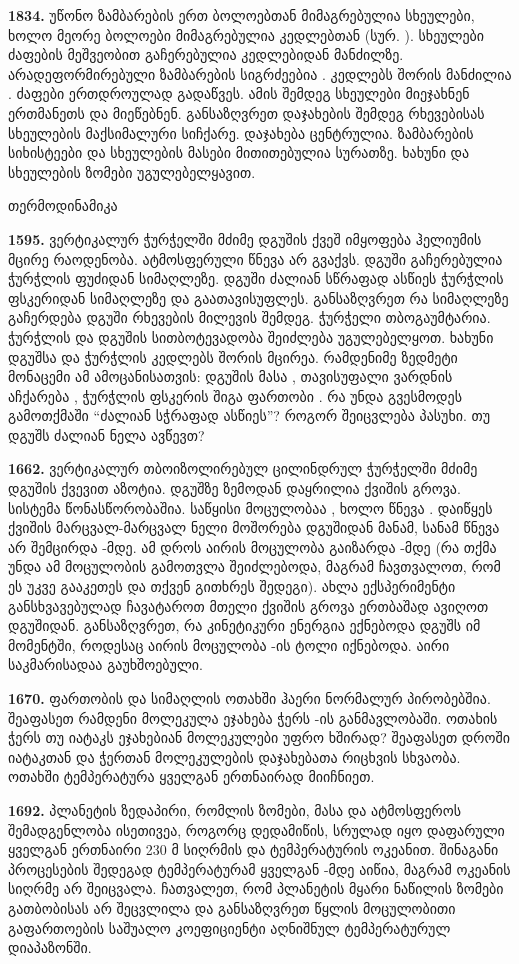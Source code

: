 \documentclass[12pt,a4paper,]{report}
\begin{document}
\textbf{1834.} უწონო ზამბარების ერთ ბოლოებთან  მიმაგრებულია სხეულები, ხოლო მეორე ბოლოები მიმაგრებულია კედლებთან (სურ. ). სხეულები ძაფების მეშვეობით გაჩერებულია კედლებიდან   მანძილზე. არადეფორმირებული ზამბარების სიგრძეებია  . კედლებს შორის მანძილია  . ძაფები ერთდროულად გადაწვეს. ამის შემდეგ სხეულები მიეჯახნენ ერთმანეთს და მიეწებნენ. განსაზღვრეთ დაჯახების შემდეგ რხევებისას სხეულების მაქსიმალური სიჩქარე. დაჯახება ცენტრულია. ზამბარების სიხისტეები და სხეულების მასები მითითებულია სურათზე. ხახუნი და სხეულების ზომები უგულებელყავით.


თერმოდინამიკა

\textbf{1595.} ვერტიკალურ ჭურჭელში მძიმე დგუშის ქვეშ იმყოფება ჰელიუმის მცირე რაოდენობა. ატმოსფერული წნევა არ გვაქვს. დგუში გაჩერებულია ჭურჭლის ფუძიდან   სიმაღლეზე. დგუში ძალიან სწრაფად ასწიეს ჭურჭლის ფსკერიდან   სიმაღლეზე და გაათავისუფლეს. განსაზღვრეთ რა სიმაღლეზე გაჩერდება დგუში რხევების მილევის შემდეგ. ჭურჭელი თბოგაუმტარია. ჭურჭლის და დგუშის სითბოტევადობა შეიძლება უგულებელყოთ. ხახუნი დგუშსა და ჭურჭლის კედლებს შორის მცირეა. რამდენიმე ზედმეტი მონაცემი ამ ამოცანისათვის: დგუშის მასა  , თავისუფალი ვარდნის აჩქარება  , ჭურჭლის ფსკერის შიგა ფართობი  . რა უნდა გვესმოდეს გამოთქმაში “ძალიან სჭრაფად ასწიეს”? როგორ შეიცვლება პასუხი. თუ დგუშს ძალიან ნელა ავწევთ?


\textbf{1662.} ვერტიკალურ თბოიზოლირებულ ცილინდრულ ჭურჭელში მძიმე დგუშის ქვევით აზოტია. დგუშზე ზემოდან დაყრილია ქვიშის გროვა. სისტემა წონასწორობაშია. საწყისი მოცულობაა  , ხოლო წნევა  . დაიწყეს ქვიშის მარცვალ-მარცვალ ნელი მოშორება დგუშიდან მანამ, სანამ წნევა არ შემცირდა  -მდე. ამ დროს აირის მოცულობა გაიზარდა  -მდე (რა თქმა უნდა ამ მოცულობის გამოთვლა შეიძლებოდა, მაგრამ ჩავთვალოთ, რომ ეს უკვე გააკეთეს და თქვენ გითხრეს შედეგი). ახლა ექსპერიმენტი განსხვავებულად ჩავატაროთ მთელი ქვიშის გროვა ერთბაშად ავიღოთ დგუშიდან. განსაზღვრეთ, რა კინეტიკური ენერგია ექნებოდა დგუშს იმ მომენტში, როდესაც აირის მოცულობა  -ის ტოლი იქნებოდა. აირი საკმარისადაა გაუხშოებული.

\textbf{1670.} ფართობის და   სიმაღლის ოთახში ჰაერი ნორმალურ პირობებშია. შეაფასეთ რამდენი მოლეკულა ეჯახება ჭერს  -ის განმავლობაში. ოთახის ჭერს თუ იატაკს ეჯახებიან მოლეკულები უფრო ხშირად? შეაფასეთ   დროში იატაკთან და ჭერთან მოლეკულების დაჯახებათა რიცხვის სხვაობა. ოთახში ტემპერატურა ყველგან ერთნაირად მიიჩნიეთ.

\textbf{1692.} პლანეტის ზედაპირი, რომლის ზომები, მასა და ატმოსფეროს შემადგენლობა ისეთივეა, როგორც დედამიწის, სრულად იყო დაფარული ყველგან ერთნაირი  230 მ სიღრმის და   ტემპერატურის ოკეანით. შინაგანი პროცესების შედეგად ტემპერატურამ ყველგან  -მდე აიწია, მაგრამ ოკეანის სიღრმე არ შეიცვალა. ჩათვალეთ, რომ პლანეტის მყარი ნაწილის ზომები გათბობისას არ შეცვლილა და განსაზღვრეთ წყლის მოცულობითი გაფართოების საშუალო კოეფიციენტი აღნიშნულ ტემპერატურულ დიაპაზონში.
\end{document}

